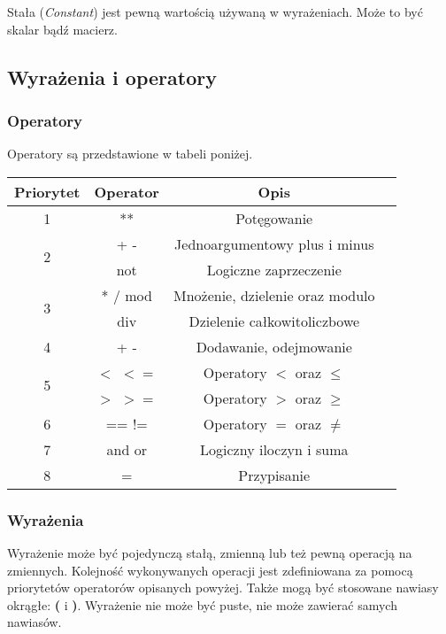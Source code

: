 \documentclass[12pt,a4paper]{article}
\begin{document}
Stała (\emph{Constant}) jest pewną wartością używaną w wyrażeniach. Może to być skalar bądź macierz.

\pagebreak

\subsection{Wyrażenia i operatory}

\subsubsection{Operatory}
Operatory są przedstawione w tabeli poniżej.

\begin{table}[ht]
  \centering
  \begin{tabular}{ |c|c|c|c| }
    \hline
    \textbf{Priorytet} & \textbf{Operator} & \textbf{Opis} \\ [0.5ex] 
    \hline
    1 & ** & Potęgowanie \\
    \hline
    \multirow{2}{*}{2} & + - & Jednoargumentowy plus i minus \\
                       & not & Logiczne zaprzeczenie  \\
    \hline
    \multirow{2}{*}{3} & * / mod & Mnożenie, dzielenie oraz modulo \\
                       & div & Dzielenie całkowitoliczbowe \\
    \hline
    4 & + - & Dodawanie, odejmowanie \\ 
    \hline
    \multirow{2}{*}{5} & $<$ $<=$ & Operatory $<$ oraz $\leq$ \\
                       & $>$ $>=$ & Operatory $>$ oraz $\geq$ \\
    \hline
    6 & == != & Operatory $=$ oraz $\neq$ \\
    \hline
    7 & and or & Logiczny iloczyn i suma \\
    \hline
    8 & = & Przypisanie \\
    \hline
  \end{tabular}
\end{table}

\subsubsection{Wyrażenia}

Wyrażenie może być pojedynczą stałą, zmienną lub też pewną operacją na zmiennych. Kolejność wykonywanych operacji jest zdefiniowana za pomocą priorytetów operatorów opisanych powyżej. Także mogą być stosowane nawiasy okrągłe: \textbf{(} i \textbf{)}. Wyrażenie nie może być puste, nie może zawierać samych nawiasów.
\end{document}
